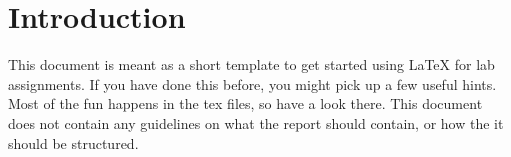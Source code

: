 \section{Introduction}
This document is meant as a short template to get started using \LaTeX{} for lab assignments. If you have done this before, you might pick up a few useful hints. Most of the fun happens in the tex files, so have a look there. This document does not contain any guidelines on what the report should contain, or how the it should be structured.
